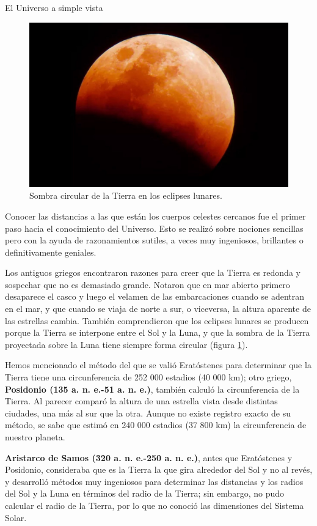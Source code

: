 \documentclass[12pt,addpoints,answers]{guia}
\begin{document}
\begin{sectionbox}{El Universo a simple vista}
    \begin{figure}
        \centering
        \includegraphics[width=\linewidth]{../images/eclipse-lunar-parcial.jpg}
        \caption{Sombra circular de la Tierra en los eclipses lunares.}
        \label{fig:eclipse-lunar-parcial}
    \end{figure}

    Conocer las distancias a las que están los cuerpos celestes cercanos fue el primer
    paso hacia el conocimiento del Universo. Esto se realizó sobre nociones sencillas pero
    con la ayuda de razonamientos sutiles, a veces muy ingeniosos, brillantes o definitivamente geniales.

    Los antiguos griegos encontraron razones para creer que la Tierra es redonda y sospechar que no es demasiado grande. Notaron que en mar abierto primero desaparece
    el casco y luego el velamen de las embarcaciones cuando se adentran en el mar, y que
    cuando se viaja de norte a sur, o viceversa, la altura aparente de las estrellas cambia. También comprendieron que los eclipses lunares
    se producen porque la Tierra se interpone entre el Sol y la Luna, y que la sombra de la Tierra proyectada sobre la Luna tiene siempre forma circular (figura \ref{fig:eclipse-lunar-parcial}).





    Hemos mencionado el método del que se valió
    Eratóstenes para determinar que la Tierra tiene una circunferencia
    de 252 000 estadios (40 000 km); otro griego, \textbf{Posidonio (135 a. n. e.-51 a. n. e.)}, también calculó la circunferencia de la Tierra. Al parecer comparó la altura de una estrella vista desde distintas ciudades,
    una más al sur que la otra. Aunque no existe registro exacto de su
    método, se sabe que estimó en 240 000 estadios (37 800 km) la circunferencia de nuestro planeta.

    \textbf{Aristarco de Samos (320 a. n. e.-250 a. n. e.)}, antes que Eratóstenes
    y Posidonio, consideraba que es la Tierra la que gira alrededor del
    Sol y no al revés, y desarrolló métodos muy ingeniosos para determinar las distancias y los radios del Sol y la Luna en términos del
    radio de la Tierra; sin embargo, no pudo calcular el radio de la Tierra, por lo que no conoció las dimensiones del Sistema Solar.
\end{sectionbox}
\begin{questions}
    \questionboxed[25]{}
    \questionboxed[25]{}
\end{questions}
\end{document}
